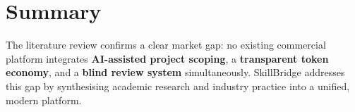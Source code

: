 \section{Summary}

\begin{featurebox}
The literature review confirms a clear market gap: no existing commercial platform
integrates \textbf{AI-assisted project scoping}, a \textbf{transparent token economy},
and a \textbf{blind review system} simultaneously. SkillBridge addresses this gap by
synthesising academic research and industry practice into a unified, modern platform.
\end{featurebox}
